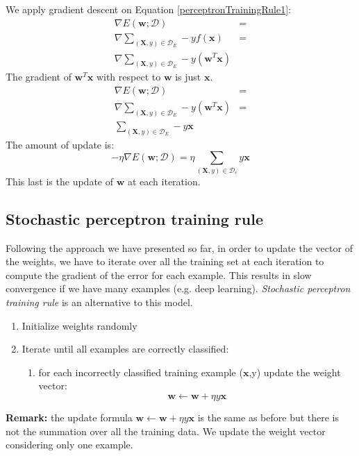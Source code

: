 We apply gradient descent on Equation \ref{perceptronTrainingRule1}:
\begin{align*}
    \nabla E(\pmb{w};\mathcal{D}) &=\\
    \nabla \sum_{(\pmb{X}, y) \in \mathcal{D}_E} -y f(\pmb{x}) &=\\
    \nabla \sum_{(\pmb{X}, y) \in \mathcal{D}_E} -y (\pmb{w}^T \pmb{x})
\end{align*}
The gradient of $\pmb{w}^T \pmb{x}$ with respect to $\pmb{w}$ is just $\pmb{x}$.
\begin{align*}
    \nabla E(\pmb{w};\mathcal{D}) &=\\
    \nabla \sum_{(\pmb{X}, y) \in \mathcal{D}_E} -y (\pmb{w}^T \pmb{x}) &=\\
    \sum_{(\pmb{X}, y) \in \mathcal{D}_E} -y \pmb{x}
\end{align*}
The amount of update is:
$$- \eta \nabla E(\pmb{w}; \mathcal{D}) = \eta \sum_{(\pmb{X},y) \in \mathcal{D}_e} y \pmb{x}$$
This last is the update of $\pmb{w}$ at each iteration.

\subsection{Stochastic perceptron training rule}
Following the approach we have presented so far, in order to update the vector of the weights, we have to iterate over all the training set at each iteration to compute the gradient of the error for each example. This results in slow convergence if we have many examples (e.g. deep learning). \textit{Stochastic perceptron training rule} is an alternative to this model.

\begin{enumerate}
    \item Initialize weights randomly
    \item Iterate until all examples are correctly classified:
    \begin{enumerate}
        \item for each incorrectly classified training example ($\pmb{x}$,y) update the weight vector:
        $$\pmb{w} \leftarrow \pmb{w}+\eta y \pmb{x}$$
    \end{enumerate}
\end{enumerate}

\textbf{Remark:} the update formula $\pmb{w} \leftarrow \pmb{w}+\eta y \pmb{x}$ is the same as before but there is not the summation over all the training data. We update the weight vector considering only one example. \newline

